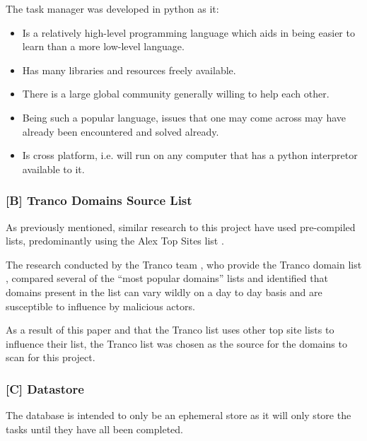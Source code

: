 \documentclass{mscreport}
\begin{document}
\noindent
The task manager was developed in python as it:

\begin{itemize}
	\setlength\itemsep{0.1em}
    \item Is a relatively high-level programming language which aids in being easier to learn than a more low-level language.
    \item Has many libraries and resources freely available.
    \item There is a large global community generally willing to help each other.
    \item Being such a popular language, issues that one may come across may have already been encountered and solved already.
    \item Is cross platform, i.e. will run on any computer that has a python interpretor available to it.
\end{itemize}

\subsubsection{[B] Tranco Domains Source List}

As previously mentioned, similar research to this project have used pre-compiled lists, predominantly using the Alex Top Sites list \cite{Buchanan2018-xz,Chen2016-dl,Kumar2017-qw,Patil2017-bg,Ying2016-ag,Michael2015-hn,Van_Goethem2014-ao,Holz2020-ha,Poteat2021-zr}.

\vspace{0.3cm} \noindent
The research conducted by the Tranco team \cite{Le_Pochat2018-ql}, who provide the Tranco domain list \cite{noauthor_undated-mt}, compared several of the ``most popular domains'' lists and identified that domains present in the list can vary wildly on a day to day basis and are susceptible to influence by malicious actors.

\vspace{0.3cm} \noindent
As a result of this paper and that the Tranco list uses other top site lists to influence their list, the Tranco list \cite{noauthor_undated-mt} was chosen as the source for the domains to scan for this project.

\subsubsection{[C] Datastore}

The database is intended to only be an ephemeral store as it will only store the tasks until they have all been completed.
\end{document}
